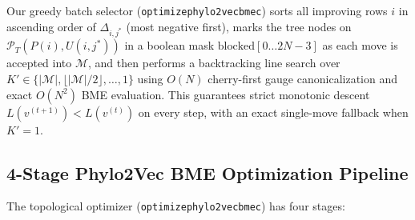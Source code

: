 \documentclass[11pt,a4paper]{article}
\makeatletter
\DeclareRobustCommand{\_}{\ifmmode\nfss@text{\textunderscore}\else\textunderscore\allowbreak\fi}
\theoremstyle{definition}
\makeatother
\begin{document}
Our greedy batch selector (\texttt{optimize\_phylo2vec\_bme\_c}) sorts all improving rows $i$ in ascending order of $\Delta_{i, j^*}$ (most negative first), marks the tree nodes on $\mathcal{P}_T(P(i), U(i, j^*))$ in a boolean mask $\text{blocked}[0 \dots 2N-3]$ as each move is accepted into $\mathcal{M}$, and then performs a backtracking line search over $K' \in \{|\mathcal{M}|, \lfloor |\mathcal{M}|/2 \rfloor, \dots, 1\}$ using $O(N)$ cherry-first gauge canonicalization and exact $O(N^2)$ BME evaluation. This guarantees strict monotonic descent $L(v^{(t+1)}) < L(v^{(t)})$ on every step, with an exact single-move fallback when $K' = 1$.

\subsection{4-Stage Phylo2Vec BME Optimization Pipeline}
The topological optimizer (\texttt{optimize\_phylo2vec\_bme\_c}) has four stages:
\end{document}
